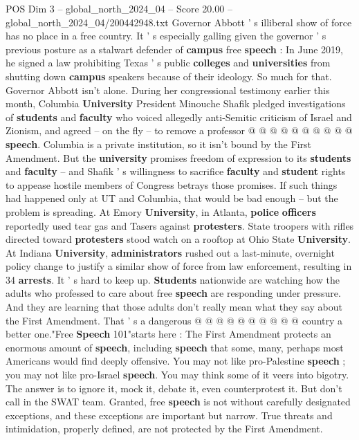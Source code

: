 \begin{textsample}{POS Dim 3 – global\_north\_2024\_04 – Score 20.00 – global\_north\_2024\_04/200442948.txt}
Governor Abbott ' s illiberal show of force has no place in a free country.
It ' s especially galling given the governor ' s previous posture as a stalwart defender of \textbf{campus} free \textbf{speech} : In June 2019, he signed a law prohibiting Texas ' s public \textbf{colleges} and \textbf{universities} from shutting down \textbf{campus} speakers because of their ideology.
So much for that.
Governor Abbott isn't alone.
During her congressional testimony earlier this month, Columbia \textbf{University} President Minouche Shafik pledged investigations of \textbf{students} and \textbf{faculty} who voiced allegedly anti-Semitic criticism of Israel and Zionism, and agreed -- on the fly -- to remove a professor @ @ @ @ @ @ @ @ @ @ \textbf{speech}.
Columbia is a private institution, so it isn't bound by the First Amendment.
But the \textbf{university} promises freedom of expression to its \textbf{students} and \textbf{faculty} -- and Shafik ' s willingness to sacrifice \textbf{faculty} and \textbf{student} rights to appease hostile members of Congress betrays those promises.
If such things had happened only at UT and Columbia, that would be bad enough -- but the problem is spreading.
At Emory \textbf{University}, in Atlanta, \textbf{police} \textbf{officers} reportedly used tear gas and Tasers against \textbf{protesters}.
State troopers with rifles directed toward \textbf{protesters} stood watch on a rooftop at Ohio State \textbf{University}.
At Indiana \textbf{University}, \textbf{administrators} rushed out a last-minute, overnight policy change to justify a similar show of force from law enforcement, resulting in 34 \textbf{arrests}.
It ' s hard to keep up. \textbf{Students} nationwide are watching how the adults who professed to care about free \textbf{speech} are responding under pressure.
And they are learning that those adults don't really mean what they say about the First Amendment.
That ' s a dangerous @ @ @ @ @ @ @ @ @ @ country a better one."Free \textbf{Speech} 101"starts here : The First Amendment protects an enormous amount of \textbf{speech}, including \textbf{speech} that some, many, perhaps most Americans would find deeply offensive.
You may not like pro-Palestine \textbf{speech} ; you may not like pro-Israel \textbf{speech}.
You may think some of it veers into bigotry.
The answer is to ignore it, mock it, debate it, even counterprotest it.
But don't call in the SWAT team.
Granted, free \textbf{speech} is not without carefully designated exceptions, and these exceptions are important but narrow.
True threats and intimidation, properly defined, are not protected by the First Amendment.

\end{textsample}
